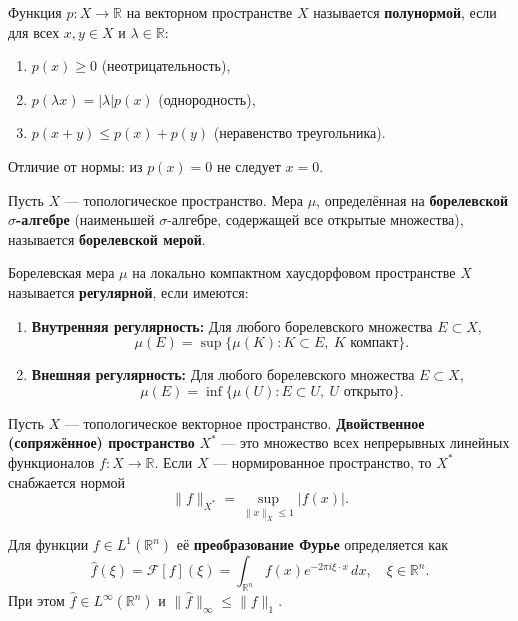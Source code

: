 \documentclass[../NDCNNAI_main.tex]{subfiles}
\begin{document}
\begin{definition}[Полунорма]
Функция \( p\colon X \to \mathbb{R} \) на векторном пространстве \( X \) называется \textbf{полунормой}, если для всех \( x, y \in X \) и \( \lambda \in \mathbb{R} \):
\begin{enumerate}
    \item \( p(x) \ge 0 \) (неотрицательность),
    \item \( p(\lambda x) = |\lambda| p(x) \) (однородность),
    \item \( p(x + y) \le p(x) + p(y) \) (неравенство треугольника).
\end{enumerate}
Отличие от нормы: из \( p(x) = 0 \) не следует \( x = 0 \).
\end{definition}

\begin{definition}
Пусть \( X \) --- топологическое пространство. Мера \( \mu \), определённая на \textbf{борелевской \( \sigma \)-алгебре} (наименьшей \( \sigma \)-алгебре, содержащей все открытые множества), называется \textbf{борелевской мерой}.
\end{definition}

\begin{definition}
Борелевская мера \( \mu \) на локально компактном хаусдорфовом пространстве \( X \) называется \textbf{регулярной}, если имеются:
\begin{enumerate}
    \item \textbf{Внутренняя регулярность:} Для любого борелевского множества \( E \subset X \),
    \[
    \mu(E) = \sup\{\mu(K)\colon K \subset E, \ K \text{ компакт}\}.
    \]
    \item \textbf{Внешняя регулярность:} Для любого борелевского множества \( E \subset X \),
    \[
    \mu(E) = \inf\{\mu(U)\colon E \subset U, \ U \text{ открыто}\}.
    \]
\end{enumerate}
\end{definition}

\begin{definition}
Пусть \( X \) --- топологическое векторное пространство. \textbf{Двойственное (сопряжённое) пространство} \( X^* \) --- это множество всех непрерывных линейных функционалов \( f\colon X \to \mathbb{R} \). Если \( X \) --- нормированное пространство, то \( X^* \) снабжается нормой
\[
\|f\|_{X^*} = \sup_{\|x\|_X \le 1} |f(x)|.
\]
\end{definition}
\begin{definition}
Для функции $f \in L^1(\mathbb{R}^n)$ её \textbf{преобразование Фурье} определяется как
\[
\hat{f}(\xi) = \mathcal{F}[f](\xi) = \int_{\mathbb{R}^n} f(x) e^{-2\pi i \xi \cdot x} \, dx, \quad \xi \in \mathbb{R}^n.
\]
При этом $\hat{f} \in L^\infty(\mathbb{R}^n)$ и $\|\hat{f}\|_\infty \le \|f\|_1$.
\end{definition}
\end{document}
